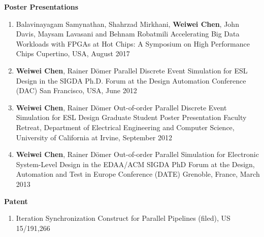 \vspace{5mm}
{\textbf{\large Poster Presentations}}
\vspace{-2mm}
\begin{enumerate}
\item
	\mypub
	{Balavinayagam Samynathan, Shahrzad Mirkhani, \textbf{Weiwei Chen}, John Davis, Maysam Lavasani and Behnam Robatmili }
	{Accelerating Big Data Workloads with FPGAs} 
	{at } 
	{Hot Chips: A Symposium on High Performance Chips}
	{Cupertino, USA, August 2017}

\item
	\mypub
	{\textbf{Weiwei Chen}, Rainer D\"{o}mer}
	{Parallel Discrete Event Simulation for ESL Design} 
	{in the } 
	{SIGDA Ph.D. Forum at the Design Automation Conference (DAC)}
	{San Francisco, USA, June 2012}
	
\item	
	\mypub
	{\textbf{Weiwei Chen}, Rainer D\"{o}mer}
	{Out-of-order Parallel Discrete Event Simulation for ESL Design}
	{}
	{Graduate Student Poster Presentation}
	{Faculty Retreat, Department of Electrical Engineering and Computer Science, University of California at Irvine, September 2012}
	
\item	
	\mypub
	{\textbf{Weiwei Chen}, Rainer D\"{o}mer}
	{Out-of-order Parallel Simulation for Electronic System-Level Design}
	{in the }
	{EDAA/ACM SIGDA PhD Forum at the Design, Automation and Test in Europe Conference (DATE)}
	{Grenoble, France, March 2013}

\end{enumerate}

\vspace{5mm}
{\textbf{\large Patent}}
\vspace{-2mm}
\begin{enumerate}
\item Iteration Synchronization Construct for Parallel Pipelines (filed), US 15/191,266
\end{enumerate}


